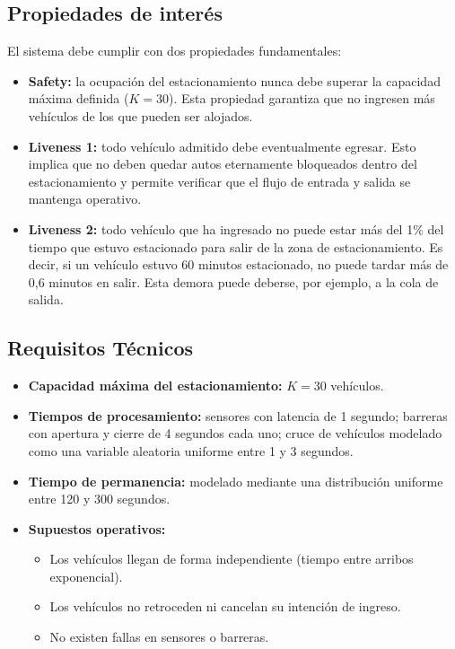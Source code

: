 \documentclass[12pt]{article}
\begin{document}
\subsection{Propiedades de interés}

El sistema debe cumplir con dos propiedades fundamentales:

\begin{itemize}
    \item \textbf{Safety:} la ocupación del estacionamiento nunca debe superar la capacidad máxima definida (\(K = 30\)). Esta propiedad garantiza que no ingresen más vehículos de los que pueden ser alojados.
    
    \item \textbf{Liveness 1:} todo vehículo admitido debe eventualmente egresar. Esto implica que no deben quedar autos eternamente bloqueados dentro del estacionamiento y permite verificar que el flujo de entrada y salida se mantenga operativo.
    \item \textbf{Liveness 2:} todo vehículo que ha ingresado no puede estar más del 1\% del tiempo que estuvo estacionado para salir de la zona de estacionamiento. Es decir, si un vehículo estuvo 60 minutos estacionado, no puede tardar más de 0{,}6 minutos en salir. Esta demora puede deberse, por ejemplo, a la cola de salida.
\end{itemize}

\subsection{Requisitos Técnicos}

\begin{itemize}
    \item \textbf{Capacidad máxima del estacionamiento:} \(K = 30\) vehículos.
    \item \textbf{Tiempos de procesamiento:} sensores con latencia de 1 segundo; barreras con apertura y cierre de 4 segundos cada uno; cruce de vehículos modelado como una variable aleatoria uniforme entre 1 y 3 segundos.
    \item \textbf{Tiempo de permanencia:} modelado mediante una distribución uniforme entre 120 y 300 segundos.
    \item \textbf{Supuestos operativos:}
    \begin{itemize}
        \item Los vehículos llegan de forma independiente (tiempo entre arribos exponencial).
        \item Los vehículos no retroceden ni cancelan su intención de ingreso.
        \item No existen fallas en sensores o barreras.
    \end{itemize}
\end{itemize}
\end{document}

